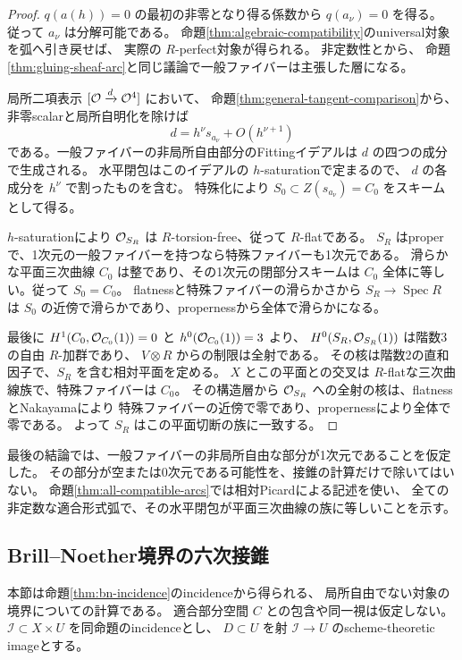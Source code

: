 \begin{proof}
$q(a(h))=0$ の最初の非零となり得る係数から $q(a_\nu)=0$ を得る。
従って $a_\nu$ は分解可能である。
命題\ref{thm:algebraic-compatibility}のuniversal対象を弧へ引き戻せば、
実際の $R$-perfect対象が得られる。
非定数性と\cite[Proposition 5.5]{FLZ}から、
命題\ref{thm:gluing-sheaf-arc}と同じ議論で一般ファイバーは主張した層になる。

局所二項表示 $[\mathcal O\xrightarrow d\mathcal O^4]$ において、
命題\ref{thm:general-tangent-comparison}から、
非零scalarと局所自明化を除けば
\[
                         d=h^\nu s_{a_\nu}+O(h^{\nu+1})
\]
である。一般ファイバーの非局所自由部分のFittingイデアルは
$d$ の四つの成分で生成される。
水平閉包はこのイデアルの $h$-saturationで定まるので、
$d$ の各成分を $h^\nu$ で割ったものを含む。
特殊化により $S_0\subset Z(s_{a_\nu})=C_0$ をスキームとして得る。

$h$-saturationにより $\mathcal O_{S_R}$ は $R$-torsion-free、従って $R$-flatである。
$S_R$ はproperで、1次元の一般ファイバーを持つなら特殊ファイバーも1次元である。
滑らかな平面三次曲線 $C_0$ は整であり、その1次元の閉部分スキームは
$C_0$ 全体に等しい。従って $S_0=C_0$。
flatnessと特殊ファイバーの滑らかさから $S_R\to\operatorname{Spec}R$ は
$S_0$ の近傍で滑らかであり、propernessから全体で滑らかになる。

最後に $H^1(C_0,\mathcal O_{C_0}(1))=0$ と $h^0(\mathcal O_{C_0}(1))=3$ より、
$H^0(S_R,\mathcal O_{S_R}(1))$ は階数3の自由 $R$-加群であり、
$V\otimes R$ からの制限は全射である。
その核は階数2の直和因子で、$S_R$ を含む相対平面を定める。
$X$ とこの平面との交叉は $R$-flatな三次曲線族で、特殊ファイバーは $C_0$。
その構造層から $\mathcal O_{S_R}$ への全射の核は、flatnessとNakayamaにより
特殊ファイバーの近傍で零であり、propernessにより全体で零である。
よって $S_R$ はこの平面切断の族に一致する。
\end{proof}

最後の結論では、一般ファイバーの非局所自由な部分が1次元であることを仮定した。
その部分が空または0次元である可能性を、接錐の計算だけで除いてはいない。
命題\ref{thm:all-compatible-arcs}では相対Picardによる記述を使い、
全ての非定数な適合形式弧で、その水平閉包が平面三次曲線の族に等しいことを示す。

\subsection{Brill--Noether境界の六次接錐}\label{sec:sextic-boundary}

本節は命題\ref{thm:bn-incidence}のincidenceから得られる、
局所自由でない対象の境界についての計算である。
適合部分空間 $C$ との包含や同一視は仮定しない。
$\mathcal I\subset X\times U$ を同命題のincidenceとし、
$D\subset U$ を射 $\mathcal I\to U$ のscheme-theoretic imageとする。

